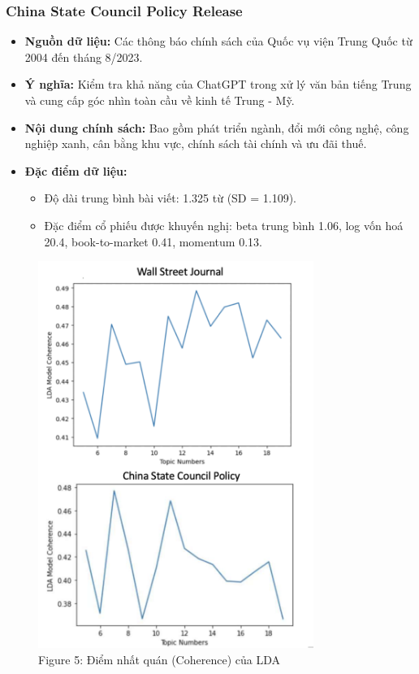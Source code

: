 \documentclass[a4paper,12pt]{article}
\begin{document}
\subsubsection{China State Council Policy Release}
\begin{itemize}
    \item \textbf{Nguồn dữ liệu:} Các thông báo chính sách của Quốc vụ viện Trung Quốc từ 2004 đến tháng 8/2023.
    \item \textbf{Ý nghĩa:} Kiểm tra khả năng của ChatGPT trong xử lý văn bản tiếng Trung và cung cấp góc nhìn toàn cầu về kinh tế Trung - Mỹ.
    \item \textbf{Nội dung chính sách:} Bao gồm phát triển ngành, đổi mới công nghệ, công nghiệp xanh, cân bằng khu vực, chính sách tài chính và ưu đãi thuế.
    \item \textbf{Đặc điểm dữ liệu:}
    \begin{itemize}
        \item Độ dài trung bình bài viết: 1.325 từ (SD = 1.109).
        \item Đặc điểm cổ phiếu được khuyến nghị: beta trung bình 1.06, log vốn hoá 20.4, book-to-market 0.41, momentum 0.13.
    \end{itemize}
\end{itemize}
\begin{figure}[H]
    \centering
    \includegraphics[width=0.8\textwidth]{fig/fig5.png}
    \caption*{Figure 5: Điểm nhất quán (Coherence) của LDA}
    \label{fig:fig2}
\end{figure}
\end{document}
